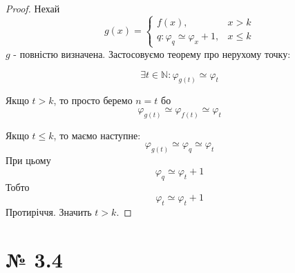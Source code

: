 \documentclass[11pt, a4paper]{article} %
\begin{document}
\begin{proof}
    Нехай 
    $$g(x) = \begin{cases}
        f(x), & x>k \\
        q : \varphi_q \simeq \varphi_x + 1, & x\le k
    \end{cases}$$
    $g$ - повністю визначена. Застосовуємо теорему про нерухому точку:

    $$\exists t\in\mathbb{N}: \varphi_{g(t)} \simeq \varphi_t$$
    
    Якщо $t > k$, то просто беремо $n = t$ бо
    $$\varphi_{g(t)} \simeq \varphi_{f(t)} \simeq \varphi_t$$

    Якщо $t \le k$, то маємо наступне:
    $$\varphi_{g(t)} \simeq \varphi_{q} \simeq \varphi_t$$
    При цьому 
    $$\varphi_q \simeq \varphi_t + 1$$
    Тобто 
    $$\varphi_t \simeq \varphi_t + 1$$
    Протиріччя. Значить $t > k$.
\end{proof}


\section*{№ 3.4}
\end{document}
